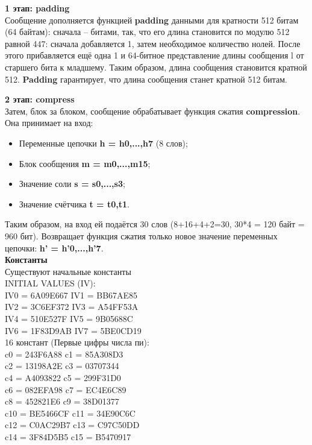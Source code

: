 \documentclass[12pt]{article}
\begin{document}
\textbf{1 этап: padding}\\
Сообщение дополняется функцией \textbf{padding} данными для кратности 512 битам (64 байтам): сначала -- битами, так, что его длина становится по модулю 512 равной 447: сначала добавляется 1, затем необходимое количество нолей. После этого прибавляется ещё одна 1 и 64-битное представление длины сообщения l от старшего бита к младшему. Таким образом, длина сообщения становится кратной 512. \textbf{Padding} гарантирует, что длина сообщения станет кратной 512 битам.\\

\newpage

\textbf{2 этап: compress}\\

Затем, блок за блоком, сообщение обрабатывает функция сжатия \textbf{compression}.\\
Она принимает на вход:
\begin{itemize}
\item Переменные цепочки \textbf{h = h0,...,h7} (8 слов);
\item Блок сообщения \textbf{m = m0,...,m15};
\item Значение соли \textbf{s = s0,...,s3};
\item Значение счётчика \textbf{t = t0,t1}.
\end{itemize}

Таким образом, на вход ей подаётся 30 слов (8+16+4+2=30, 30*4 = 120 байт = 960 бит). Возвращает функция сжатия только новое значение переменных цепочки: \textbf{h' = h'0,...,h'7}.\\

\textbf{Константы}\\
Существуют начальные константы\\

INITIAL VALUES (IV):\\
IV0 = 6A09E667 \quad IV1 = BB67AE85\\
IV2 = 3C6EF372 \quad IV3 = A54FF53A\\
IV4 = 510E527F \quad IV5 = 9B05688C\\
IV6 = 1F83D9AB \quad IV7 = 5BE0CD19\\

16 констант (Первые цифры числа пи):\\
c0  = 243F6A88 \quad c1  = 85A308D3\\
c2  = 13198A2E \quad c3  = 03707344\\
c4  = A4093822 \quad c5  = 299F31D0\\
c6  = 082EFA98 \quad c7  = EC4E6C89\\
c8  = 452821E6 \quad c9  = 38D01377\\
c10 = BE5466CF \quad c11 = 34E90C6C\\
c12 = C0AC29B7 \quad c13 = C97C50DD\\
c14 = 3F84D5B5 \quad c15 = B5470917\\
\end{document}
